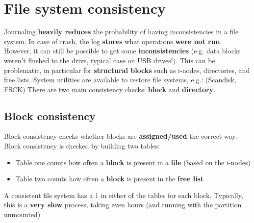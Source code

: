 \documentclass{article}
\begin{document}
\section{File system consistency}
\begin{flushleft}
Journaling \textbf{heavily reduces} the probability of having inconsistencies in a file system. In case of crash, the log \textbf{stores} what operations \textbf{were not run}. However, it can still be possible to get some \textbf{inconsistencies} (e.g. data blocks weren’t flushed to the drive, typical case on USB drives!). This can be problematic, in particular for \textbf{structural blocks} such as i-nodes, directories, and free lists. System utilities are available to restore file systems, e.g.: (Scandisk, FSCK) There are two main consistency checks: \textbf{block} and \textbf{directory}.
\end{flushleft}

\subsection{Block consistency}
\begin{flushleft}
Block consistency checks whether blocks are \textbf{assigned/used} the correct way. Block consistency is checked by building two tables:
\begin{itemize}
	\item Table one counts how often a \textbf{block} is present in a \textbf{file} (based on the i-nodes)
	\item Table two counts how often a \textbf{block} is present in the \textbf{free list} 
\end{itemize}
A consistent file system has a 1 in either of the tables for each block. Typically, this is a \textbf{very slow} process, taking even hours (and running with the partition unmounted)
\end{flushleft}
\end{document}
